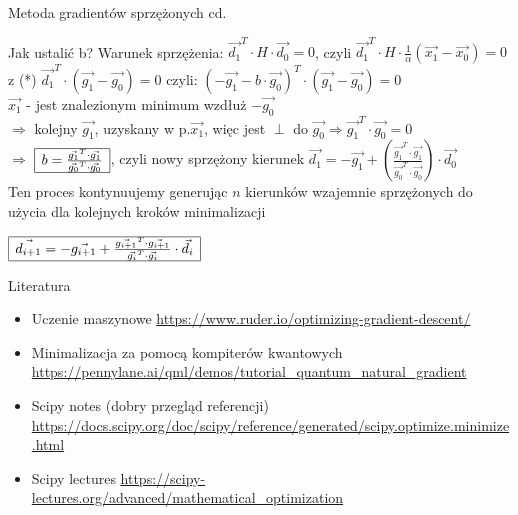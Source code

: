   \begin{frame}{Metoda gradientów sprzężonych cd. }

   \begin{block}{Jak ustalić b?}
	  Warunek sprzężenia: $\vec{d_1}^T \cdot H \cdot \vec{d_0}  = 0$,
	  czyli $\vec{d_1}^T \cdot H \cdot \frac{1}{\alpha}(\vec{x_1}-\vec{x_0}) = 0$
	  z (*) $\vec{d_1}^T  \cdot (\vec{g_1} - \vec{g_0})=0$ czyli:
  $
 (-\vec{g_1} -b \cdot \vec{g_0})^T \cdot (\vec{g_1} - \vec{g_0}) = 0$
	  \\$\vec{x_1}$ - jest znalezionym minimum wzdłuż $-\vec{g_0}$\\ $\Rightarrow$
	  kolejny $\vec{g_1}$, uzyskany w p.$\vec{x_1}$, więc jest $\perp$ do $\vec{g_0}  \Rightarrow  \vec{g_1}^T \cdot \vec{g_0} = 0$
	  \smallskip
	  \\$\Rightarrow$
	  $\begin{array}{|c|}
 	   	 \hline
 	   	    b = \frac{\vec{g_1}^T \cdot \vec{g_1}}{\vec{g_0}^T \cdot \vec{g_0}}
 	   	 \\ \hline
	  \end{array}$,
 	  czyli nowy sprzężony kierunek $\vec{d_1} = -\vec{g_1} + \left(\frac{\vec{g_1}^T \cdot \vec{g_1}}{\vec{g_0}^T \cdot \vec{g_0}}\right) \cdot \vec{d_0} $
 	  \medskip
 	  \\Ten proces kontynuujemy generując $n$ kierunków  wzajemnie sprzężonych do użycia dla kolejnych kroków minimalizacji 
 	  \begin{center}
 	  	 $\begin{array}{|c|}
 	   	   \hline
 	   	      \vec{d_{i+1}} = -\vec{g_{i+1}} + \frac{\vec{g_{i+1}}^T \cdot \vec{g_{i+1}}}{\vec{g_{i}}^T \cdot \vec{g_{i}}} \cdot \vec{d_i}
 	   	   \\ \hline
	    \end{array}$
 	  \end{center}
 	
 	\end{block}

  \end{frame}
  \begin{frame}{Literatura}
  \begin{itemize}
  \item Uczenie maszynowe
  \url{https://www.ruder.io/optimizing-gradient-descent/}
     \item Minimalizacja za pomocą kompiterów kwantowych \url{https://pennylane.ai/qml/demos/tutorial_quantum_natural_gradient}
     \item Scipy notes (dobry przegląd referencji) \url{https://docs.scipy.org/doc/scipy/reference/generated/scipy.optimize.minimize.html}
     \item Scipy lectures \url{https://scipy-lectures.org/advanced/mathematical_optimization}
  \end{itemize}
  \end{frame}
